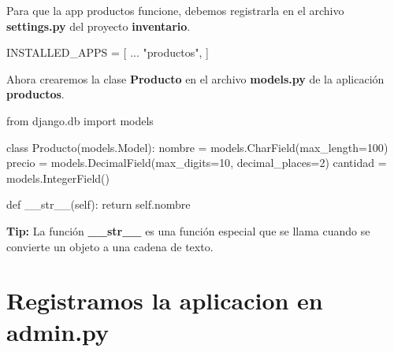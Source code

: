 \documentclass[
  a4paper,
  DIV=11,
  numbers=noendperiod,
  onepage,
  openany]{scrreprt}
\newenvironment{Shaded}{\begin{snugshade}}{\end{snugshade}}
\newcommand{\ControlFlowTok}[1]{\textcolor[rgb]{0.00,0.23,0.31}{#1}}
\newcommand{\DecValTok}[1]{\textcolor[rgb]{0.68,0.00,0.00}{#1}}
\newcommand{\FunctionTok}[1]{\textcolor[rgb]{0.28,0.35,0.67}{#1}}
\newcommand{\ImportTok}[1]{\textcolor[rgb]{0.00,0.46,0.62}{#1}}
\newcommand{\KeywordTok}[1]{\textcolor[rgb]{0.00,0.23,0.31}{#1}}
\newcommand{\NormalTok}[1]{\textcolor[rgb]{0.00,0.23,0.31}{#1}}
\newcommand{\OperatorTok}[1]{\textcolor[rgb]{0.37,0.37,0.37}{#1}}
\newcommand{\StringTok}[1]{\textcolor[rgb]{0.13,0.47,0.30}{#1}}
\newcommand{\VariableTok}[1]{\textcolor[rgb]{0.07,0.07,0.07}{#1}}
\begin{document}
Para que la app productos funcione, debemos registrarla en el archivo
\textbf{settings.py} del proyecto \textbf{inventario}.

\begin{Shaded}
\begin{Highlighting}[]
\NormalTok{INSTALLED\_APPS }\OperatorTok{=}\NormalTok{ [}
\NormalTok{    ...}
    \StringTok{"productos"}\NormalTok{,}
\NormalTok{]}
\end{Highlighting}
\end{Shaded}

Ahora crearemos la clase \textbf{Producto} en el archivo
\textbf{models.py} de la aplicación \textbf{productos}.

\begin{Shaded}
\begin{Highlighting}[]
\ImportTok{from}\NormalTok{ django.db }\ImportTok{import}\NormalTok{ models}

\KeywordTok{class}\NormalTok{ Producto(models.Model):}
\NormalTok{    nombre }\OperatorTok{=}\NormalTok{ models.CharField(max\_length}\OperatorTok{=}\DecValTok{100}\NormalTok{)}
\NormalTok{    precio }\OperatorTok{=}\NormalTok{ models.DecimalField(max\_digits}\OperatorTok{=}\DecValTok{10}\NormalTok{, decimal\_places}\OperatorTok{=}\DecValTok{2}\NormalTok{)}
\NormalTok{    cantidad }\OperatorTok{=}\NormalTok{ models.IntegerField()}

    \KeywordTok{def} \FunctionTok{\_\_str\_\_}\NormalTok{(}\VariableTok{self}\NormalTok{):}
        \ControlFlowTok{return} \VariableTok{self}\NormalTok{.nombre}
\end{Highlighting}
\end{Shaded}

\begin{tcolorbox}[enhanced jigsaw, title=\textcolor{quarto-callout-tip-color}{\faLightbulb}\hspace{0.5em}{Tip}, colback=white, rightrule=.15mm, opacityback=0, colframe=quarto-callout-tip-color-frame, titlerule=0mm, opacitybacktitle=0.6, breakable, coltitle=black, colbacktitle=quarto-callout-tip-color!10!white, bottomtitle=1mm, toptitle=1mm, left=2mm, arc=.35mm, toprule=.15mm, leftrule=.75mm, bottomrule=.15mm]

\textbf{Tip:} La función \textbf{\_\_str\_\_} es una función especial
que se llama cuando se convierte un objeto a una cadena de texto.

\end{tcolorbox}

\chapter{Registramos la aplicacion en
admin.py}\label{registramos-la-aplicacion-en-admin.py}
\end{document}

